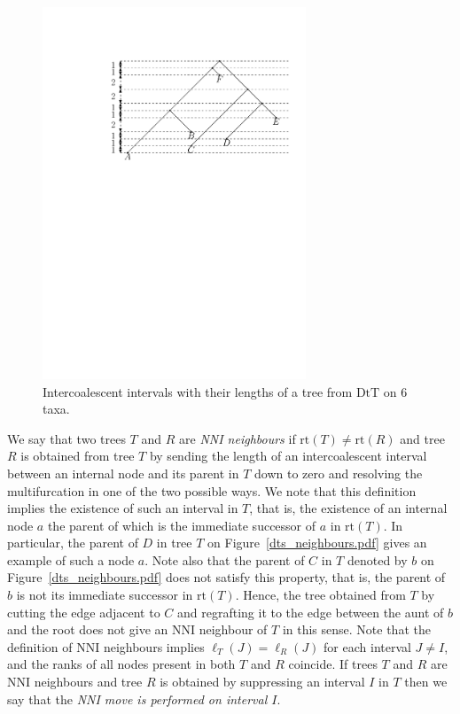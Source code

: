 \documentclass{amsart}
\newcommand{\dts}{\mathrm{DtT}}
\newcommand{\rt}{\mathrm{rt}}
\begin{document}
\begin{figure}
\centering
\includegraphics[width=0.7\textwidth]{T5.pdf}
\caption{Intercoalescent intervals with their lengths of a tree from $\dts$ on $6$ taxa.}
\label{T5.pdf}
\end{figure}

We say that two trees $T$ and $R$ are {\em NNI neighbours} if $\rt(T) \ne \rt(R)$ and tree $R$ is obtained from tree $T$ by sending the length of an intercoalescent interval between an internal node and its parent in $T$ down to zero and resolving the multifurcation in one of the two possible ways.
We note that this definition implies the existence of such an interval in $T$, that is, the existence of an internal node $a$ the parent of which is the immediate successor of $a$ in $\rt(T)$.
In particular, the parent of $D$ in tree $T$ on Figure~\ref{dts_neighbours.pdf} gives an example of such a node $a$.
Note also that the parent of $C$ in $T$ denoted by $b$ on Figure~\ref{dts_neighbours.pdf} does not satisfy this property, that is, the parent of $b$ is not its immediate successor in $\rt(T)$.
Hence, the tree obtained from $T$ by cutting the edge adjacent to $C$ and regrafting it to the edge between the aunt of $b$ and the root does not give an NNI neighbour of $T$ in this sense.
Note that the definition of NNI neighbours implies $\ell_T(J) = \ell_R(J)$ for each interval $J \ne I$, and the ranks of all nodes present in both $T$ and $R$ coincide.
If trees $T$ and $R$ are NNI neighbours and tree $R$ is obtained by suppressing an interval $I$ in $T$ then we say that the {\em NNI move is performed on interval $I$}.
\end{document}
